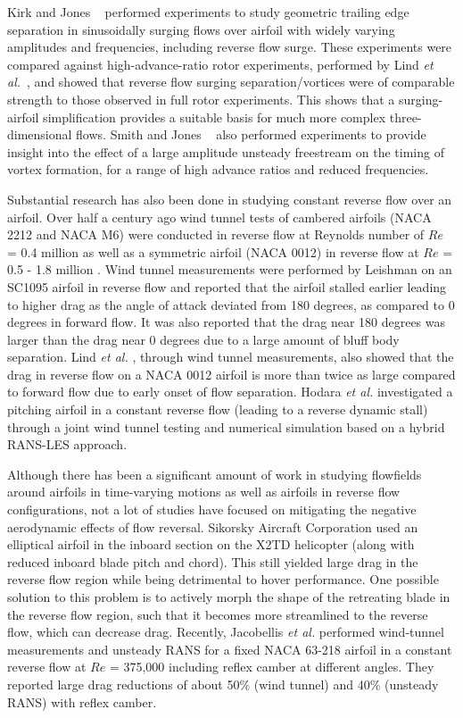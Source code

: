 Kirk and Jones ~\cite{bib:kirk_jones_2019} performed experiments to study geometric trailing edge separation in sinusoidally surging flows over airfoil with widely varying amplitudes and frequencies, including reverse flow surge. These experiments were compared against high-advance-ratio rotor experiments, performed by 
Lind \textit{et al.}~\cite{bib:Lind2018}, and showed that reverse flow surging separation/vortices were of comparable strength to those observed in full rotor experiments. This shows that a surging-airfoil simplification provides a suitable basis for much more complex three-dimensional flows.
Smith and Jones ~\cite{bib:smith2020} also performed experiments to provide insight into the effect of a large amplitude unsteady freestream on the timing of vortex formation, for a range of high advance ratios and reduced frequencies. 

Substantial research has also been done in studying constant reverse flow over an airfoil. 
Over half a century ago wind tunnel tests of
cambered airfoils (NACA 2212 and NACA M6) were conducted in reverse
flow at Reynolds number of $Re$ = 0.4 million \cite{bib:naumann1942}  as well as a symmetric airfoil (NACA 0012) in reverse flow at $Re$ = 0.5 - 1.8 million
\cite{bib:critzos1955}.
Wind tunnel measurements were performed by Leishman  on an
SC1095 airfoil in reverse flow \cite{bib:leishman1993} and reported that the airfoil stalled earlier leading to higher drag
as the angle of attack deviated from 180 degrees, as compared to 0 degrees in forward flow. 
It was also reported
that the drag near 180 degrees was larger than the drag near 0 degrees due to a large amount of bluff body separation.
Lind \textit{et al.} \cite{bib:lind2013, bib:lind2014}, through wind tunnel measurements, also showed that the drag in reverse flow on a NACA 0012 airfoil is more than twice as large compared to forward flow
due to early onset of flow separation. 
Hodara \textit{et al.} \cite{bib:hodara2016} investigated a pitching airfoil in a constant reverse flow (leading to a reverse dynamic stall) through a joint wind tunnel testing and numerical simulation based on a hybrid RANS-LES approach.

Although there has been a significant amount of work in studying flowfields around airfoils in time-varying motions as well as airfoils in reverse flow configurations, not a lot of studies have focused on mitigating the negative aerodynamic effects of flow reversal. Sikorsky Aircraft Corporation used an elliptical airfoil in the
inboard section on the X2TD helicopter \cite{bib:bagai2008} (along with reduced inboard blade pitch
and chord). This still yielded large drag in the reverse flow region while being detrimental to hover performance. 
One possible solution to this problem is to actively morph the shape of the retreating blade in the reverse flow region, such that it becomes more streamlined to the reverse flow, which can decrease drag. 
Recently, Jacobellis \textit{et al.} \cite{bib:jacobellis2018} performed wind-tunnel measurements and unsteady RANS for a fixed NACA 63-218 airfoil
in a constant reverse flow at $Re$ = 375,000 including reflex camber at different angles.
They reported large drag reductions of about 50\% (wind tunnel) and 40\% (unsteady RANS) with reflex camber.

